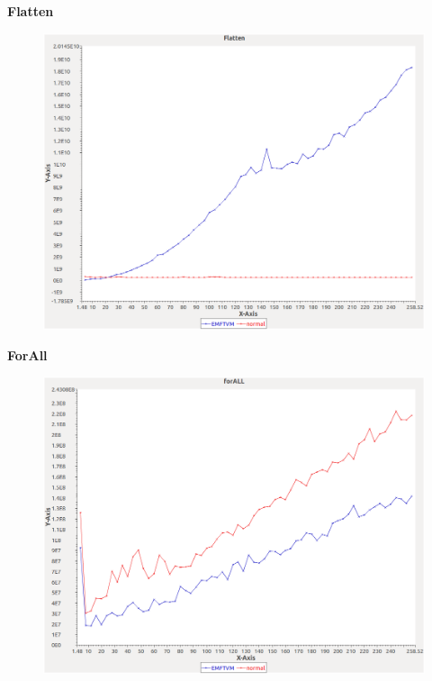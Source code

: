 \noindent\textbf{Flatten}

\begin{figure}[h]
\centering
\includegraphics[width=\textwidth]{../graphs/sequence/Flatten}
\end{figure}
\pagebreak

\noindent\textbf{ForAll}

\begin{figure}[h]
\centering
\includegraphics[width=\textwidth]{../graphs/sequence/forALL}
\end{figure}
\pagebreak

